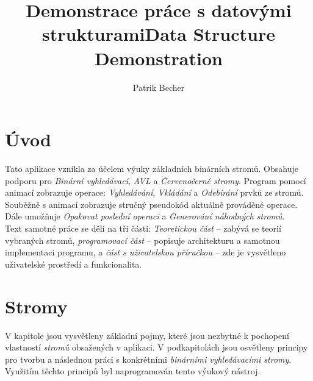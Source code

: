 \documentclass[
  biblatex=false,
  font=serif,
  glossaries=false,
  tables=false,
  theorems=false,
  index
]{kidiplom}
\title{Demonstrace práce s datovými strukturami}
\title[english]{Data Structure Demonstration}
\author{Patrik Becher}
\begin{document}


\maketitle





\section{Úvod}
\indent\indent Tato aplikace vznikla za účelem výuky základních binárních stromů. Obsahuje podporu pro \textit{Binární vyhledávací}, \textit{AVL} a \textit{Červenočerné stromy}. Program pomocí animací zobrazuje operace: \textit{Vyhledávání}, \textit{Vkládání} a \textit{Odebírání} prvků ze stromů. Souběžně s animací zobrazuje stručný pseudokód aktuálně prováděné operace. Dále umožňuje \textit{Opakovat poslední operaci} a \textit{Generování náhodných stromů}.\\
\indent Text samotné práce se dělí na tři části: \textit{Teoretickou část} -- zabývá se teorií vybraných stromů, \textit{programovací část} -- popisuje architekturu a samotnou implementaci programu, a \textit{část s uživatelskou příručkou} --  zde je vysvětleno uživatelské prostředí a funkcionalita.

\newpage
\section{Stromy}
\indent \indent V kapitole jsou vysvětleny základní pojmy, které jsou nezbytné k pochopení vlastností \textit{stromů} obsažených v aplikaci. V podkapitolách jsou osvětleny principy pro tvorbu a následnou práci s konkrétními \textit{binárními vyhledávacími stromy}. Využitím těchto principů byl naprogramován tento výukový nástroj.\\
\end{document}
